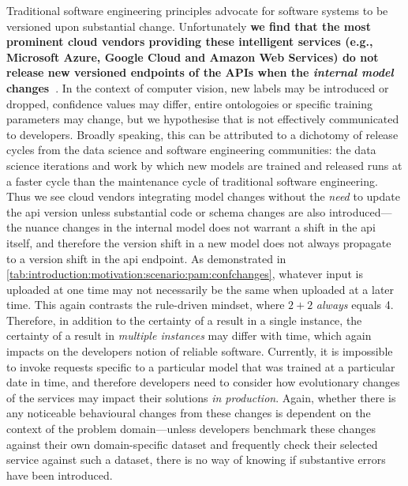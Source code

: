 Traditional software engineering principles advocate for software systems to be versioned upon substantial change. Unfortunately \textbf{we find that the most prominent cloud vendors providing these intelligent services (e.g., Microsoft Azure, Google Cloud and Amazon Web Services) do not release new versioned endpoints of the APIs when the \textit{internal model} changes~\citep{Cummaudo:2019icsme}}. In the context of computer vision, new labels may be introduced or dropped, confidence values may differ, entire ontologoies or specific training parameters may change, but we hypothesise that is not effectively communicated to developers. Broadly speaking, this can be attributed to a dichotomy of release cycles from the data science and software engineering communities: the data science iterations and work by which new models are trained and released runs at a faster cycle than the maintenance cycle of traditional software engineering. Thus we see cloud vendors integrating model changes without the \textit{need} to update the \gls{api} version unless substantial code or schema changes are also introduced---the nuance changes in the internal model does not warrant a shift in the \gls{api} itself, and therefore the version shift in a new model does not always propagate to a version shift in the \gls{api} endpoint.
As demonstrated in \cref{tab:introduction:motivation:scenario:pam:confchanges}, whatever input is uploaded at one time may not necessarily be the same when uploaded at a later time. This again contrasts the rule-driven mindset, where $2+2$ \textit{always} equals 4. Therefore, in addition to the certainty of a result in a single instance, the certainty of a result in \textit{multiple instances} may differ with time, which again impacts on the developers notion of reliable software.
Currently, it is impossible to invoke requests specific to a particular model that was trained at a particular date in time, and therefore developers need to consider how evolutionary changes of the services may impact their solutions \textit{in production}. Again, whether there is any noticeable behavioural changes from these changes is dependent on the context of the problem domain---unless developers benchmark these changes against their own domain-specific dataset and frequently check their selected service against such a dataset, there is no way of knowing if substantive errors have been introduced.

